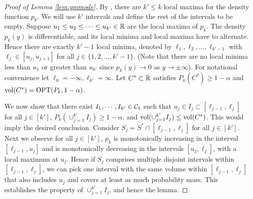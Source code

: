 \begin{proof}[Proof of Lemma \ref{lem:gmmode}]
By \cite{carreira2003number}, there are $k' \le k$ local maxima for the density function $p_k$. We will use $k'$ intervals and define the rest of the intervals to be empty. Suppose $u_1 \le u_2 \le  \dots \le u_{k'} \in \mathbb{R}$ are the local maxima of $p_k$. The density $p_k(y)$ is differentiable, and its local minima and local maxima have to alternate. Hence there are exactly $k'-1$ local minima, denoted by $\ell_1, \ell_2, \dots, \ell_{k'-1}$ with $\ell_j \in [u_{j}, u_{j+1}]$ for all $ j \in \{1,2,\dots, k'-1\}$. (Note that there are no local minima less than $u_1$ or greater than $u_{k'}$ since $p_k(y) \to 0$ as $y \to \pm \infty$). For notational convenience let $\ell_0 = -\infty, \ell_{k'}=\infty$. Let $C^* \subset \mathbb{R}$  satisfies $P_k(C^*)\geq 1-\alpha$ and $\mathrm{vol}(C^*)=\operatorname{OPT}(P_k,1-\alpha)$.

We now show that there exist $I_1,\cdots,I_{k'}\in\mathcal{C}_1$ such that $u_j\in I_j\subset [\ell_{j-1},\ell_j]$ for all $j\in[k']$, $P_k(\cup_{j=1}^{k'}I_j)\geq 1-\alpha$, and $\mathrm{vol}(\cup_{j=1}^{k'}I_j)\leq \mathrm{vol}(C^*)$. This would imply the desired conclusion. Consider $S_j = S^* \cap [\ell_{j-1}, \ell_j]$ for all $j \in [k']$. Next we observe for all $j \in [k']$, $p_k$ is monotonically increasing in the interval $[\ell_{j-1}, u_{j}]$ and is monotonically decreasing in the intervals $[u_j, \ell_j]$, with a local maximum at $u_j$. Hence if $S_j$ comprises multiple disjoint intervals within $[\ell_{j-1}, \ell_{j}]$, we can pick one interval with the same volume within $[\ell_{j-1}, \ell_j]$ that also includes $u_j$ and covers at least as much probability mass. This establishes the property of $\cup_{j=1}^{k'}I_j$, and hence the lemma.
\end{proof}

